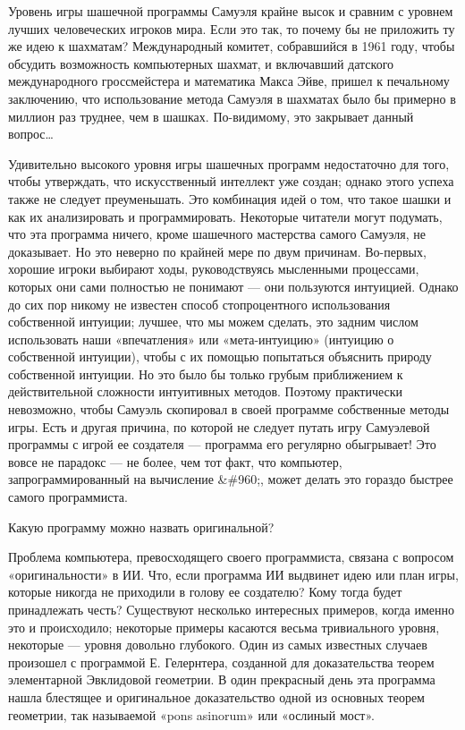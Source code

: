 Уровень игры шашечной программы Самуэля крайне высок и сравним с уровнем лучших человеческих игроков мира. Если это так, то почему бы не приложить ту же идею к шахматам? Международный комитет, собравшийся в 1961 году, чтобы обсудить возможность компьютерных шахмат, и включавший датского международного гроссмейстера и математика Макса Эйве, пришел к печальному заключению, что использование метода Самуэля в шахматах было бы примерно в миллион раз труднее, чем в шашках. По-видимому, это закрывает данный вопрос\ldots{}

Удивительно высокого уровня игры шашечных программ недостаточно для того, чтобы утверждать, что искусственный интеллект уже создан; однако этого успеха также не следует преуменьшать. Это комбинация идей о том, что такое шашки и как их анализировать и программировать. Некоторые читатели могут подумать, что эта программа ничего, кроме шашечного мастерства самого Самуэля, не доказывает. Но это неверно по крайней мере по двум причинам. Во-первых, хорошие игроки выбирают ходы, руководствуясь мысленными процессами, которых они сами полностью не понимают --- они пользуются интуицией. Однако до сих пор никому не известен способ стопроцентного использования собственной интуиции; лучшее, что мы можем сделать, это задним числом использовать наши «впечатления» или «мета-интуицию» (интуицию о собственной интуиции), чтобы с их помощью попытаться объяснить природу собственной интуиции. Но это было бы только грубым приближением к действительной сложности интуитивных методов. Поэтому практически невозможно, чтобы Самуэль скопировал в своей программе собственные методы игры. Есть и другая причина, по которой не следует путать игру Самуэлевой программы с игрой ее создателя --- программа его регулярно обыгрывает! Это вовсе не парадокс --- не более, чем тот факт, что компьютер, запрограммированный на вычисление \&\#960;, может делать это гораздо быстрее самого программиста.

Какую программу можно назвать оригинальной?

Проблема компьютера, превосходящего своего программиста, связана с вопросом «оригинальности» в ИИ. Что, если программа ИИ выдвинет идею или план игры, которые никогда не приходили в голову ее создателю? Кому тогда будет принадлежать честь? Существуют несколько интересных примеров, когда именно это и происходило; некоторые примеры касаются весьма тривиального уровня, некоторые --- уровня довольно глубокого. Один из самых известных случаев произошел с программой Е. Гелернтера, созданной для доказательства теорем элементарной Эвклидовой геометрии. В один прекрасный день эта программа нашла блестящее и оригинальное доказательство одной из основных теорем геометрии, так называемой «pons asinorum» или «ослиный мост».

